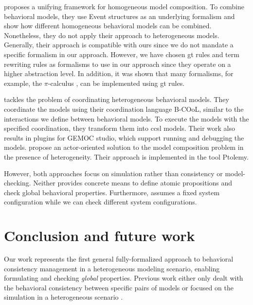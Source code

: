 \documentclass{jot}
\begin{document}
\cite{kienzleUnifyingFrameworkHomogeneous2019} proposes a unifying framework for homogeneous model composition.
To combine behavioral models, they use Event structures as an underlying formalism and show how different homogeneous behavioral models can be combined.
Nonetheless, they do not apply their approach to heterogeneous models.
Generally, their approach is compatible with ours since we do not mandate a specific formalism in our approach.
However, we have chosen \gls*{gt} rules and term rewriting rules as formalisms to use in our approach since they operate on a higher abstraction level.
In addition, it was shown that many formalisms, for example, the $\pi$-calculus \cite{gadducciGraphRewritingPcalculus2007}, can be implemented using \gls*{gt} rules.

\cite{varalarsenBehavioralCoordinationOperator2015} tackles the problem of coordinating heterogeneous behavioral models.
They coordinate the models using their coordination language B-COoL, similar to the interactions we define between behavioral models.
To execute the models with the specified coordination, they transform them into \gls*{ccsl} models.  
Their work also results in plugins for GEMOC studio, which support running and debugging the models.
\cite{ekerTamingHeterogeneityPtolemy2003} propose an actor-oriented solution to the model composition problem in the presence of heterogeneity.
Their approach is implemented in the tool Ptolemy.

However, both approaches focus on simulation rather than consistency or model-checking.
Neither provides concrete means to define atomic propositions and check global behavioral properties.
Furthermore, \cite{varalarsenBehavioralCoordinationOperator2015} assumes a fixed system configuration while we can check different system configurations.


\section{Conclusion and future work} \label{sec:conclusion_and_future_work}
Our work represents the first general fully-formalized approach to behavioral consistency management in a heterogeneous modeling scenario, enabling formulating and checking \emph{global} properties.
Previous work either only dealt with the behavioral consistency between specific pairs of models \cite{yaoConsistencyCheckingUML2006, kusterExplicitBehavioralConsistency2003} or focused on the simulation in a heterogeneous scenario \cite{ekerTamingHeterogeneityPtolemy2003, varalarsenBehavioralCoordinationOperator2015}.
\end{document}
